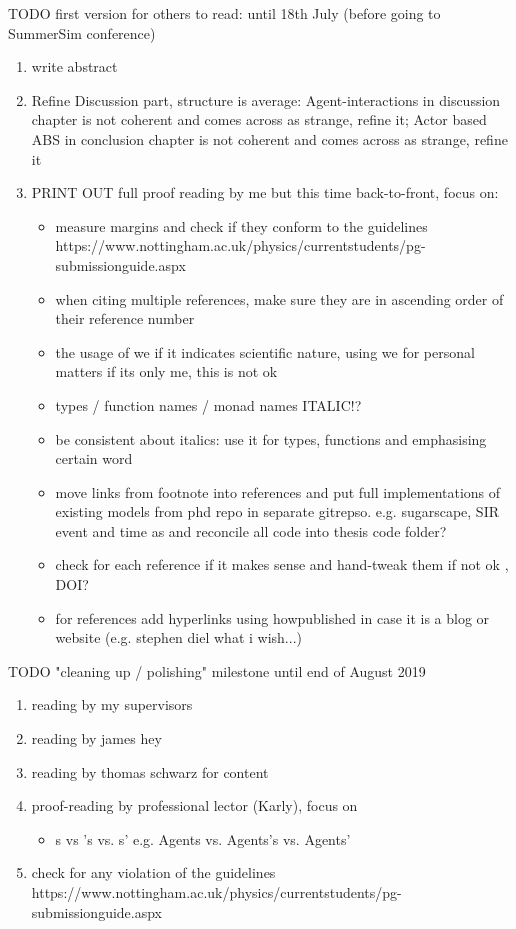 \documentclass[oneside]{book}
\begin{document}
TODO first version for others to read: until 18th July (before going to SummerSim conference)
\begin{enumerate}
	\item write abstract
	
	\item Refine Discussion part, structure is average: Agent-interactions in discussion chapter is not coherent and comes across as strange, refine it; Actor based ABS in conclusion chapter is not coherent and comes across as strange, refine it

	\item PRINT OUT full proof reading by me but this time back-to-front, focus on:
	\begin{itemize}
		\item measure margins and check if they conform to the guidelines https://www.nottingham.ac.uk/physics/currentstudents/pg-submissionguide.aspx
		\item when citing multiple references, make sure they are in ascending order of their reference number	
		\item the usage of we if it indicates scientific nature, using we for personal matters if its only me, this is not ok	
		\item types / function names / monad names ITALIC!?	
		\item be consistent about italics: use it for types, functions and emphasising certain word
		\item move links from footnote into references and put full implementations of existing models from phd repo in separate gitrepso. e.g. sugarscape, SIR event and time as and reconcile all code into thesis code folder?
		\item check for each reference if it makes sense and hand-tweak them if not ok	, DOI?	
		\item for references add hyperlinks using howpublished in case it is a blog or website (e.g. stephen diel what i wish...)	
	\end{itemize}
\end{enumerate}

TODO "cleaning up / polishing" milestone until end of August 2019
\begin{enumerate}
	\item reading by my supervisors

	\item reading by james hey
	
	\item reading by thomas schwarz for content
		
	\item proof-reading by professional lector (Karly), focus on 
	\begin{itemize}
		\item s vs 's vs. s' e.g. Agents vs. Agents's vs. Agents'
	\end{itemize}
	
	\item check for any violation of the guidelines https://www.nottingham.ac.uk/physics/currentstudents/pg-submissionguide.aspx
\end{enumerate}
\end{document}
